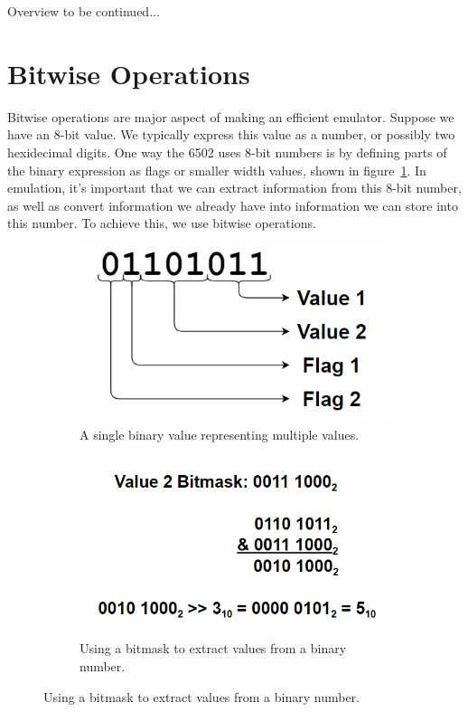 \documentclass[12pt]{article}
\begin{document}
Overview to be continued...

\section{Bitwise Operations}
\label{sec:bitwise}

Bitwise operations are major aspect of making an efficient emulator. Suppose we have an 8-bit value.
We typically express this value as a number, or possibly two hexidecimal digits. One way the 6502 uses
8-bit numbers is by defining parts of the binary expression as flags or smaller width values, shown in figure~\ref{fig:figure1}.
In emulation, it's important that we can extract information from this 8-bit number, as well as convert
information we already have into information we can store into this number. To achieve this, we use
bitwise operations.

\begin{figure}[b!]
	\centering
	\begin{subfigure}[t]{0.5\linewidth}
		\includegraphics[bb=0 0 462 262]{figure1.PNG}
		\caption{A single binary value representing multiple values.}
		\label{fig:figure1}
	\end{subfigure}
	\begin{subfigure}[t]{0.4\linewidth}
		\includegraphics[bb=0 0 554 320]{figure2.PNG}
		\caption{Using a bitmask to extract values from a binary number.}
		\label{fig:figure2}
	\end{subfigure}
\end{figure}
\end{document}
